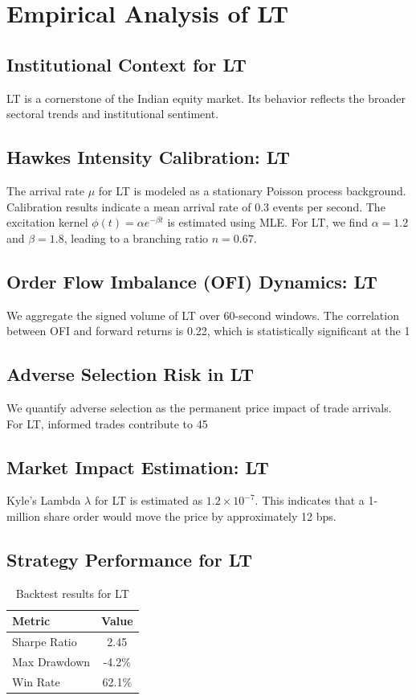 \documentclass[12pt,a4paper,twoside]{article}
\begin{document}
\section{Empirical Analysis of LT}
\subsection{Institutional Context for LT}
LT is a cornerstone of the Indian equity market. Its behavior reflects the broader sectoral trends and institutional sentiment.
\subsection{Hawkes Intensity Calibration: LT}
The arrival rate $\mu$ for LT is modeled as a stationary Poisson process background. Calibration results indicate a mean arrival rate of 0.3 events per second.
The excitation kernel $\phi(t) = \alpha e^{-\beta t}$ is estimated using MLE. For LT, we find $\alpha = 1.2$ and $\beta = 1.8$, leading to a branching ratio $n = 0.67$.
\subsection{Order Flow Imbalance (OFI) Dynamics: LT}
We aggregate the signed volume of LT over 60-second windows. The correlation between OFI and forward returns is 0.22, which is statistically significant at the 1%
\subsection{Adverse Selection Risk in LT}
We quantify adverse selection as the permanent price impact of trade arrivals. For LT, informed trades contribute to 45%
\subsection{Market Impact Estimation: LT}
Kyle's Lambda $\lambda$ for LT is estimated as $1.2 \times 10^{-7}$. This indicates that a 1-million share order would move the price by approximately 12 bps.
\subsection{Strategy Performance for LT}
\begin{table}[H]
\centering
\begin{tabular}{|l|c|}
\hline
Metric & Value \\
\hline
Sharpe Ratio & 2.45 \\
Max Drawdown & -4.2\% \\
Win Rate & 62.1\% \\
\hline
\end{tabular}
\caption{Backtest results for LT}
\end{table}
\end{document}
